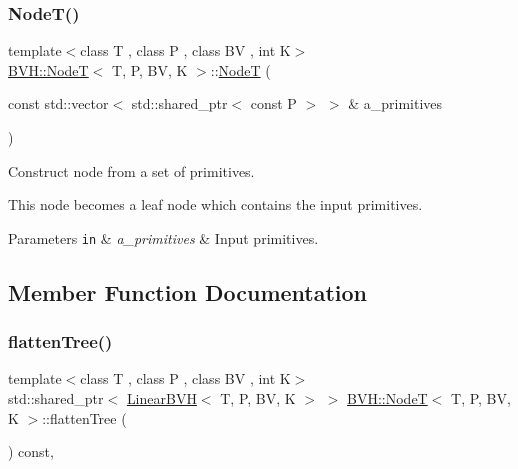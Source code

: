\subsubsection{\texorpdfstring{Node\+T()}{NodeT()}\hspace{0.1cm}{\footnotesize\ttfamily [2/2]}}
{\footnotesize\ttfamily template$<$class T , class P , class BV , int K$>$ \\
\hyperlink{classBVH_1_1NodeT}{B\+V\+H\+::\+NodeT}$<$ T, P, BV, K $>$\+::\hyperlink{classBVH_1_1NodeT}{NodeT} (\begin{DoxyParamCaption}\item[{const std\+::vector$<$ std\+::shared\+\_\+ptr$<$ const P $>$ $>$ \&}]{a\+\_\+primitives }\end{DoxyParamCaption})\hspace{0.3cm}{\ttfamily [inline]}}



Construct node from a set of primitives. 

This node becomes a leaf node which contains the input primitives. 
\begin{DoxyParams}[1]{Parameters}
\mbox{\tt in}  & {\em a\+\_\+primitives} & Input primitives. \\
\hline
\end{DoxyParams}


\subsection{Member Function Documentation}
\mbox{\label{classBVH_1_1NodeT_acb801f1e446a6472f5d330e85318bdb3}} 
\subsubsection{\texorpdfstring{flatten\+Tree()}{flattenTree()}\hspace{0.1cm}{\footnotesize\ttfamily [1/2]}}
{\footnotesize\ttfamily template$<$class T , class P , class BV , int K$>$ \\
std\+::shared\+\_\+ptr$<$ \hyperlink{classBVH_1_1LinearBVH}{Linear\+B\+VH}$<$ T, P, BV, K $>$ $>$ \hyperlink{classBVH_1_1NodeT}{B\+V\+H\+::\+NodeT}$<$ T, P, BV, K $>$\+::flatten\+Tree (\begin{DoxyParamCaption}{ }\end{DoxyParamCaption}) const\hspace{0.3cm}{\ttfamily [inline]}, {\ttfamily [noexcept]}}



